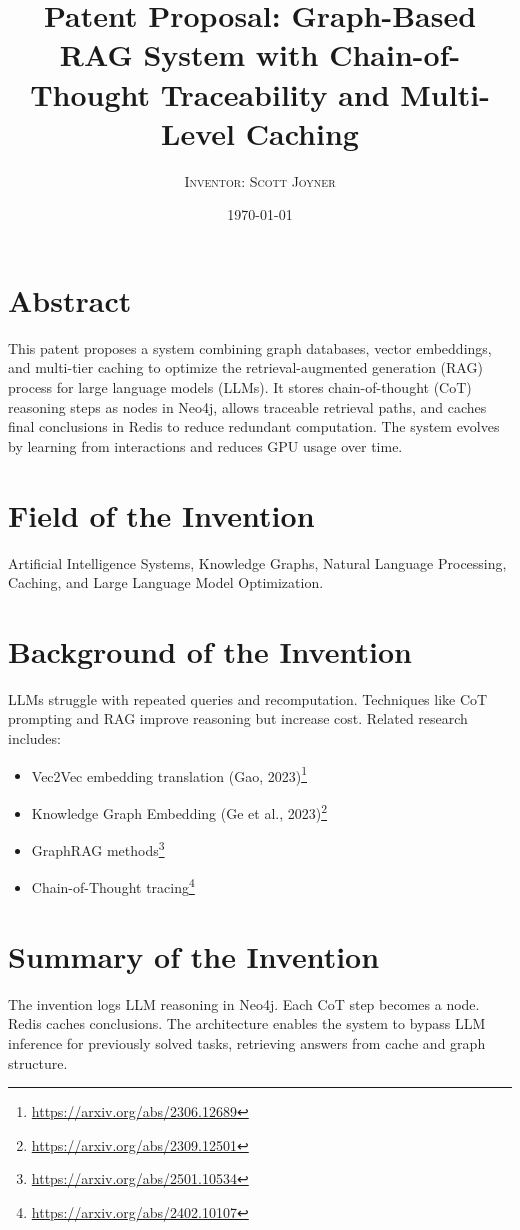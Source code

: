 \documentclass[12pt]{article}
\title{\Huge\bfseries Patent Proposal: Graph-Based RAG System with Chain-of-Thought Traceability and Multi-Level Caching}
\author{\textsc{Inventor: Scott Joyner}}
\date{\today}
\begin{document}
\maketitle

\section*{Abstract}
This patent proposes a system combining graph databases, vector embeddings, and multi-tier caching to optimize the retrieval-augmented generation (RAG) process for large language models (LLMs). It stores chain-of-thought (CoT) reasoning steps as nodes in Neo4j, allows traceable retrieval paths, and caches final conclusions in Redis to reduce redundant computation. The system evolves by learning from interactions and reduces GPU usage over time.

\section*{Field of the Invention}
Artificial Intelligence Systems, Knowledge Graphs, Natural Language Processing, Caching, and Large Language Model Optimization.

\section*{Background of the Invention}
LLMs struggle with repeated queries and recomputation. Techniques like CoT prompting and RAG improve reasoning but increase cost. Related research includes:
\begin{itemize}
  \item Vec2Vec embedding translation (Gao, 2023)\footnote{\url{https://arxiv.org/abs/2306.12689}}
  \item Knowledge Graph Embedding (Ge et al., 2023)\footnote{\url{https://arxiv.org/abs/2309.12501}}
  \item GraphRAG methods\footnote{\url{https://arxiv.org/abs/2501.10534}}
  \item Chain-of-Thought tracing\footnote{\url{https://arxiv.org/abs/2402.10107}}
\end{itemize}

\section*{Summary of the Invention}
The invention logs LLM reasoning in Neo4j. Each CoT step becomes a node. Redis caches conclusions. The architecture enables the system to bypass LLM inference for previously solved tasks, retrieving answers from cache and graph structure.
\end{document}
